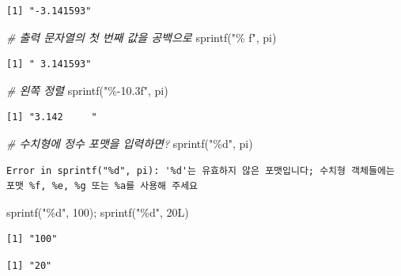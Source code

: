 \documentclass[
  11pt,
]{krantz}
\newenvironment{Shaded}{\begin{snugshade}}{\end{snugshade}}
\newcommand{\CommentTok}[1]{\textcolor[rgb]{0.37,0.37,0.37}{\textit{#1}}}
\newcommand{\DecValTok}[1]{\textcolor[rgb]{0.06,0.06,0.06}{#1}}
\newcommand{\FunctionTok}[1]{\textcolor[rgb]{0,0,0}{#1}}
\newcommand{\NormalTok}[1]{#1}
\newcommand{\StringTok}[1]{\textcolor[rgb]{0.5,0.5,0.5}{#1}}
\begin{document}
\begin{verbatim}
[1] "-3.141593"
\end{verbatim}

\begin{Shaded}
\begin{Highlighting}[]
\CommentTok{\# 출력 문자열의 첫 번째 값을 공백으로}
\FunctionTok{sprintf}\NormalTok{(}\StringTok{"\% f"}\NormalTok{, pi) }
\end{Highlighting}
\end{Shaded}

\begin{verbatim}
[1] " 3.141593"
\end{verbatim}

\begin{Shaded}
\begin{Highlighting}[]
\CommentTok{\# 왼쪽 정렬}
\FunctionTok{sprintf}\NormalTok{(}\StringTok{"\%{-}10.3f"}\NormalTok{, pi)}
\end{Highlighting}
\end{Shaded}

\begin{verbatim}
[1] "3.142     "
\end{verbatim}

\begin{Shaded}
\begin{Highlighting}[]
\CommentTok{\# 수치형에 정수 포맷을 입력하면?}
\FunctionTok{sprintf}\NormalTok{(}\StringTok{"\%d"}\NormalTok{, pi)}
\end{Highlighting}
\end{Shaded}

\begin{verbatim}
Error in sprintf("%d", pi): '%d'는 유효하지 않은 포맷입니다; 수치형 객체들에는 포맷 %f, %e, %g 또는 %a를 사용해 주세요
\end{verbatim}

\begin{Shaded}
\begin{Highlighting}[]
\FunctionTok{sprintf}\NormalTok{(}\StringTok{"\%d"}\NormalTok{, }\DecValTok{100}\NormalTok{); }\FunctionTok{sprintf}\NormalTok{(}\StringTok{"\%d"}\NormalTok{, 20L)}
\end{Highlighting}
\end{Shaded}

\begin{verbatim}
[1] "100"
\end{verbatim}

\begin{verbatim}
[1] "20"
\end{verbatim}
\end{document}
